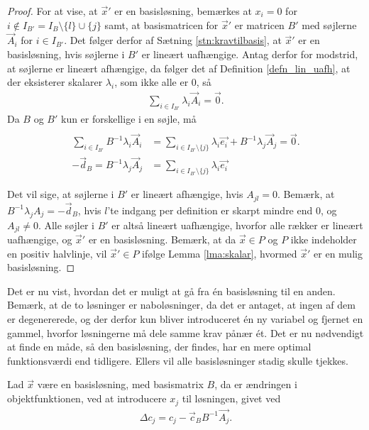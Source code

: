 \begin{proof}
For at vise, at $\vec{x}'$ er en basisløsning, bemærkes at $x_i = 0$ for $i \notin I_{B'} = I_B\setminus\{l\}\cup\{j\}$ samt, at basismatricen for $\vec{x}'$ er matricen $B'$ med søjlerne $\vec{A}_i$ for $i \in I_{B'}$. 
Det følger derfor af Sætning \ref{stn:kravtilbasis},
at $\vec{x}'$ er en basisløsning, hvis søjlerne i $B'$ er lineært uafhængige.
Antag derfor for modstrid, at søjlerne er lineært afhængige, da følger det af Definition \ref{defn_lin_uafh},
at der eksisterer skalarer $\lambda_i$, som ikke alle er 0, så
\begin{align*}
 \sum_{i \in I_{B'}} \lambda_i \vec{A}_i = \vec{0}.
\end{align*}
Da $B$ og $B'$ kun er forskellige i en søjle, må
\begin{align*}
 \\ \sum_{i \in I_{B'}}  B^{-1} \lambda_i \vec{A}_i & =\sum_{i \in I_{B'}\setminus \{j\}} \lambda_i\vec{e_i} + B^{-1} \lambda_j \vec{A}_j = \vec{0}.\\
 -\vec{d}_B = B^{-1} \lambda_j \vec{A}_j &= \sum_{i \in I_{B'}\setminus \{j\}} \lambda_i\vec{e_i}
\end{align*}

Det vil sige, at søjlerne i $B'$ er lineært afhængige, hvis $A_{jl} = 0$.
Bemærk, at $B^{-1} \lambda_j A_j = - \vec{d}_B$, hvis $l$'te indgang per definition er skarpt mindre end $0$, og $A_{jl} \neq 0$.
Alle søjler i $B'$ er altså lineært uafhængige, hvorfor alle rækker er lineært uafhængige, og $\vec{x}'$ er en basisløsning.
Bemærk, at da $\vec{x}\in P$ og $P$ ikke indeholder en positiv halvlinje, vil $\vec{x}' \in P$ ifølge Lemma \ref{lma:skalar}, hvormed $\vec{x}'$ er en mulig basisløsning.
\end{proof}

Det er nu vist, hvordan det er muligt at gå fra én basisløsning til en anden.
Bemærk, at de to løsninger er naboløsninger, da det er antaget, at ingen af dem er degenererede, og der derfor kun bliver introduceret én ny variabel og fjernet en gammel, hvorfor løsningerne må dele samme krav pånær ét. 
Det er nu nødvendigt at finde en måde, så den basisløsning, der findes, har en mere optimal funktionsværdi end tidligere. Ellers vil alle basisløsninger stadig skulle tjekkes. 

\begin{stn}
Lad $\vec{x}$ være en basisløsning, med basismatrix $B$, da er ændringen i objektfunktionen, ved at introducere $x_j$ til løsningen, givet ved
\begin{align*}
 \Delta c_j = c_j-\vec{c}_B B^{-1}\vec{A_j}.
\end{align*}
\label{stn:Deltac}
\end{stn}

